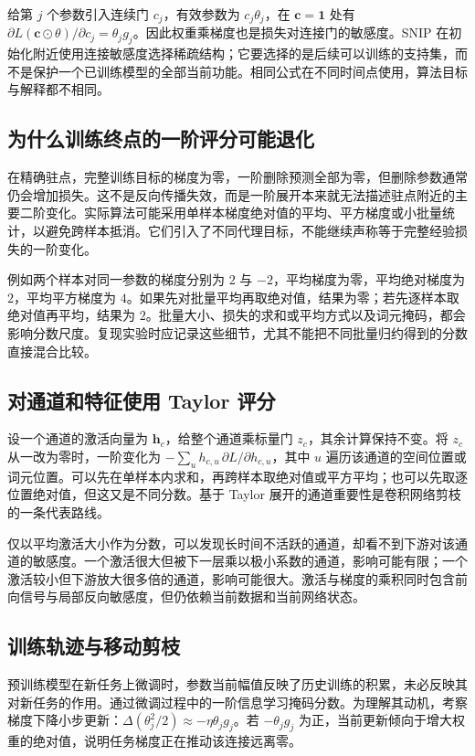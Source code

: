 \documentclass[UTF8,12pt,a4paper,fontset=fandol]{ctexart}
\begin{document}
给第 $j$ 个参数引入连续门 $c_j$，有效参数为 $c_j\theta_j$，在 $\mathbf c=\mathbf 1$ 处有 $\partial L(\mathbf c\odot\theta)/\partial c_j=\theta_jg_j$。因此权重乘梯度也是损失对连接门的敏感度。SNIP 在初始化附近使用连接敏感度选择稀疏结构\cite{lee2019}；它要选择的是后续可以训练的支持集，而不是保护一个已训练模型的全部当前功能。相同公式在不同时间点使用，算法目标与解释都不相同。

\subsection{为什么训练终点的一阶评分可能退化}
在精确驻点，完整训练目标的梯度为零，一阶删除预测全部为零，但删除参数通常仍会增加损失。这不是反向传播失效，而是一阶展开本来就无法描述驻点附近的主要二阶变化。实际算法可能采用单样本梯度绝对值的平均、平方梯度或小批量统计，以避免跨样本抵消。它们引入了不同代理目标，不能继续声称等于完整经验损失的一阶变化。

例如两个样本对同一参数的梯度分别为 $2$ 与 $-2$，平均梯度为零，平均绝对梯度为 $2$，平均平方梯度为 $4$。如果先对批量平均再取绝对值，结果为零；若先逐样本取绝对值再平均，结果为 $2$。批量大小、损失的求和或平均方式以及词元掩码，都会影响分数尺度。复现实验时应记录这些细节，尤其不能把不同批量归约得到的分数直接混合比较。

\subsection{对通道和特征使用 Taylor 评分}
设一个通道的激活向量为 $\mathbf h_c$，给整个通道乘标量门 $z_c$，其余计算保持不变。将 $z_c$ 从一改为零时，一阶变化为 $-\sum_u h_{c,u}\,\partial L/\partial h_{c,u}$，其中 $u$ 遍历该通道的空间位置或词元位置。可以先在单样本内求和，再跨样本取绝对值或平方平均；也可以先取逐位置绝对值，但这又是不同分数。基于 Taylor 展开的通道重要性是卷积网络剪枝的一条代表路线\cite{molchanov2017}。

仅以平均激活大小作为分数，可以发现长时间不活跃的通道，却看不到下游对该通道的敏感度。一个激活很大但被下一层乘以极小系数的通道，影响可能有限；一个激活较小但下游放大很多倍的通道，影响可能很大。激活与梯度的乘积同时包含前向信号与局部反向敏感度，但仍依赖当前数据和当前网络状态。

\subsection{训练轨迹与移动剪枝}
预训练模型在新任务上微调时，参数当前幅值反映了历史训练的积累，未必反映其对新任务的作用。通过微调过程中的一阶信息学习掩码分数\cite{sanh2020}。为理解其动机，考察梯度下降小步更新：$\Delta(\theta_j^2/2)\approx-\eta\theta_jg_j$。若 $-\theta_jg_j$ 为正，当前更新倾向于增大权重的绝对值，说明任务梯度正在推动该连接远离零。
\end{document}
